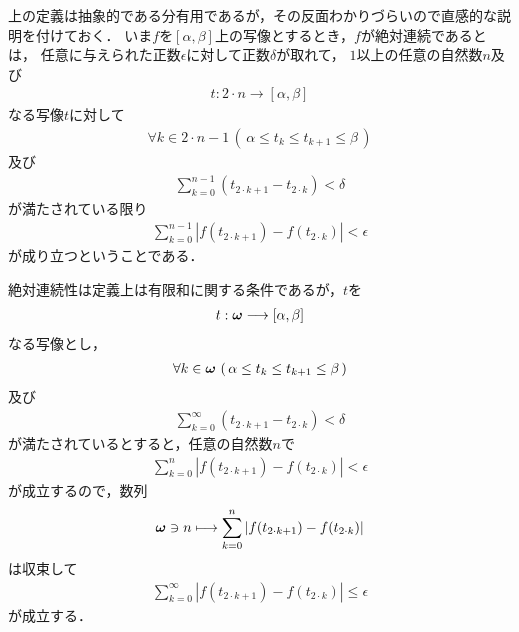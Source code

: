 	上の定義は抽象的である分有用であるが，その反面わかりづらいので直感的な説明を付けておく．
	いま$f$を$[\alpha,\beta]$上の写像とするとき，$f$が絶対連続であるとは，
	任意に与えられた正数$\epsilon$に対して正数$\delta$が取れて，
	$1$以上の任意の自然数$n$及び
	\begin{align}
		t:2 \cdot n \longrightarrow [\alpha,\beta]
	\end{align}
	なる写像$t$に対して
	\begin{align}
		\forall k \in 2 \cdot n-1\, \left(\, \alpha \leq t_{k} \leq t_{k+1} \leq \beta\, \right)
	\end{align}
	及び
	\begin{align}
		\sum_{k=0}^{n-1} (t_{2 \cdot k + 1} - t_{2 \cdot k}) < \delta
	\end{align}
	が満たされている限り
	\begin{align}
		\sum_{k=0}^{n-1} \left|f(t_{2 \cdot k + 1}) - f(t_{2 \cdot k})\right| < \epsilon
	\end{align}
	が成り立つということである．
	
	
	絶対連続性は定義上は有限和に関する条件であるが，$t$を
	\begin{align}
		t:{\boldsymbol \omega} \longrightarrow [\alpha,\beta]
	\end{align}
	なる写像とし，
	\begin{align}
		\forall k \in {\boldsymbol \omega}\, \left(\, \alpha \leq t_{k} \leq t_{k+1} \leq \beta\, \right)
	\end{align}
	及び
	\begin{align}
		\sum_{k=0}^{\infty} (t_{2 \cdot k + 1} - t_{2 \cdot k}) < \delta
	\end{align}
	が満たされているとすると，任意の自然数$n$で
	\begin{align}
		\sum_{k=0}^{n} \left|f(t_{2 \cdot k + 1}) - f(t_{2 \cdot k})\right| < \epsilon
	\end{align}
	が成立するので，数列
	\begin{align}
		{\boldsymbol \omega} \ni n \longmapsto \sum_{k=0}^{n} \left|f(t_{2 \cdot k + 1}) - f(t_{2 \cdot k})\right|
	\end{align}
	は収束して
	\begin{align}
		\sum_{k=0}^{\infty} \left|f(t_{2 \cdot k + 1}) - f(t_{2 \cdot k})\right| \leq \epsilon
	\end{align}
	が成立する．
	
	\begin{screen}
		\begin{thm}[$AC$は線型空間である]
		\end{thm}
	\end{screen}
	

